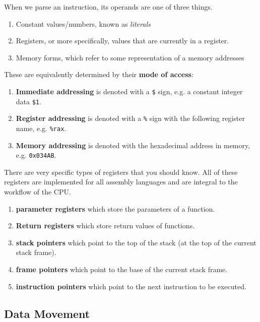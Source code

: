   \begin{definition}
    When we parse an instruction, its operands are one of three things. 
    \begin{enumerate}
      \item Constant values/numbers, known as \textit{literals}
      \item Registers, or more specifically, values that are currently in a register. 
      \item Memory forms, which refer to some representation of a memory addresses 
    \end{enumerate}

    These are equivalently determined by their \textbf{mode of access}:
    \begin{enumerate} 
      \item \textbf{Immediate addressing} is denoted with a \texttt{\$} sign, e.g. a constant integer data \texttt{\$1}. 
      \item \textbf{Register addressing} is denoted with a \texttt{\%} sign with the following register name, e.g. \texttt{\%rax}.
      \item \textbf{Memory addressing} is denoted with the hexadecimal address in memory, e.g. \texttt{0x034AB}.
    \end{enumerate}
  \end{definition}

  \begin{example}[Register]
    There are very specific types of registers that you should know. All of these registers are implemented for all assembly languages and are integral to the workflow of the CPU.  
    \begin{enumerate}
      \item \textbf{parameter registers} which store the parameters of a function.
      \item \textbf{Return registers} which store return values of functions. 
      \item \textbf{stack pointers} which point to the top of the stack (at the top of the current stack frame). 
      \item \textbf{frame pointers} which point to the base of the current stack frame.
      \item \textbf{instruction pointers} which point to the next instruction to be executed.
    \end{enumerate}
  \end{example}

\subsection{Data Movement}

